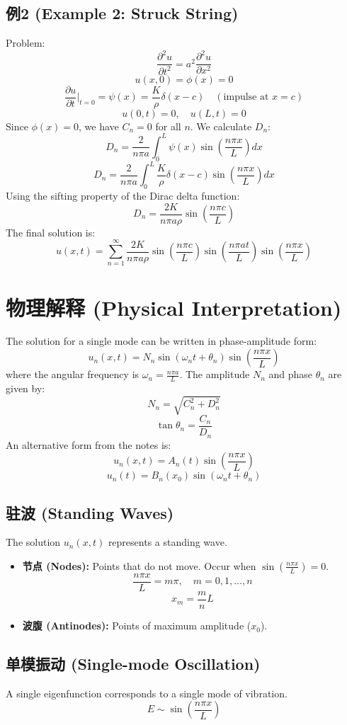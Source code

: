 \documentclass{article}
\begin{document}
	\subsection*{例2 (Example 2: Struck String)}
	Problem:
	$$ \frac{\partial^2 u}{\partial t^2} = a^2 \frac{\partial^2 u}{\partial x^2} $$
	$$ u(x,0) = \phi(x) = 0 $$
	$$ \frac{\partial u}{\partial t}\bigg|_{t=0} = \psi(x) = \frac{K}{\rho}\delta(x-c) \quad (\text{impulse at } x=c) $$
	$$ u(0,t) = 0, \quad u(L,t) = 0 $$
	Since $\phi(x)=0$, we have $C_n = 0$ for all $n$.
	We calculate $D_n$:
	$$ D_n = \frac{2}{n\pi a} \int_0^L \psi(x) \sin\left(\frac{n\pi x}{L}\right) dx $$
	$$ D_n = \frac{2}{n\pi a} \int_0^L \frac{K}{\rho} \delta(x-c) \sin\left(\frac{n\pi x}{L}\right) dx $$
	Using the sifting property of the Dirac delta function:
	$$ D_n = \frac{2K}{n\pi a \rho} \sin\left(\frac{n\pi c}{L}\right) $$
	The final solution is:
	$$ u(x,t) = \sum_{n=1}^{\infty} \frac{2K}{n\pi a \rho} \sin\left(\frac{n\pi c}{L}\right) \sin\left(\frac{n\pi a t}{L}\right) \sin\left(\frac{n\pi x}{L}\right) $$
	
	\section*{物理解释 (Physical Interpretation)}
	The solution for a single mode can be written in phase-amplitude form:
	$$ u_n(x,t) = N_n \sin(\omega_n t + \theta_n) \sin\left(\frac{n\pi x}{L}\right) $$
	where the angular frequency is $\omega_n = \frac{n\pi a}{L}$.
	The amplitude $N_n$ and phase $\theta_n$ are given by:
	$$ N_n = \sqrt{C_n^2+D_n^2} $$
	$$ \tan\theta_n = \frac{C_n}{D_n} $$
	An alternative form from the notes is:
	$$ u_n(x,t) = A_n(t) \sin\left(\frac{n\pi x}{L}\right) $$
	$$ u_n(t) = B_n(x_0) \sin(\omega_n t + \theta_n) $$
	
	\subsection*{驻波 (Standing Waves)}
	The solution $u_n(x,t)$ represents a standing wave.
	\begin{itemize}
		\item \textbf{节点 (Nodes):} Points that do not move. Occur when $\sin(\frac{n\pi x}{L}) = 0$.
		$$ \frac{n\pi x}{L} = m\pi, \quad m = 0, 1, \dots, n $$
		$$ x_m = \frac{m}{n}L $$
		\item \textbf{波腹 (Antinodes):} Points of maximum amplitude ($x_0$).
	\end{itemize}
	
	\subsection*{单模振动 (Single-mode Oscillation)}
	A single eigenfunction corresponds to a single mode of vibration.
	$$ E \sim \sin\left(\frac{n\pi x}{L}\right) $$
	
\end{document}
